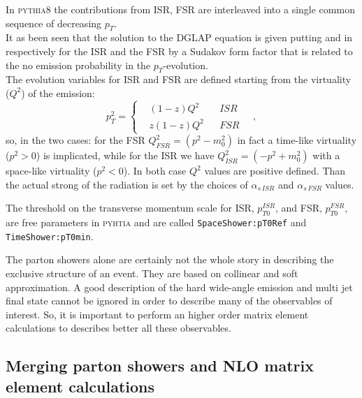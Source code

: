  In \textsc{pythia}8 the contributions from ISR, FSR are interleaved into a single common sequence of decreasing $p_T$. 
\\
It as been seen that the solution to the DGLAP equation is given putting  and  in  respectively for the ISR and the FSR by a Sudakov form factor that is related to the no emission probability in the $p_T$-evolution. 
\\
The evolution variables for ISR and FSR are defined starting from the virtuality ($Q^2$) of the emission:
\begin{equation}
	p_T^2=\left\{\begin{aligned}
		&(1-z)Q^2 && ISR\\
		&z(1-z)Q^2 && FSR
	\end{aligned}\right.\quad,
	\label{eq:partonShowerEvolutionVariables}
\end{equation}
so, in the two cases: for the FSR $Q^2_{FSR}=(p^2-m_0^2)$ in fact a time-like virtuality ($p^2>0$) is implicated, while for the ISR we have $Q^2_{ISR}=(-p^2+m_0^2)$ with a space-like virtuality ($p^2<0$). In both case $Q^2$ values are positive defined. Than the actual strong of the radiation is set by the choices of $\alpha_{s\,ISR}$ and $\alpha_{s\,FSR}$ values.

The threshold on the transverse momentum scale for ISR, $p_{T0}^{ISR}$, and FSR, $p_{T0}^{FSR}$,  are free parameters in \textsc{pyhtia} and are called \texttt{Space}\-\texttt{Shower:}\-\texttt{pT0}\-\texttt{Ref}   and \texttt{Time}\-\texttt{Shower:}\-\texttt{pT0}\-\texttt{min}.


The parton showers alone are certainly not the whole story in describing the exclusive structure of an event. They are based on collinear and soft approximation. A good description of the hard wide-angle emission and multi jet final state cannot be ignored in order to describe many of the observables of interest. So, it is important to perform an higher order matrix element calculations to describes better all these observables.  


\subsection{Merging parton showers and NLO matrix element calculations}
\label{sec:merging}

